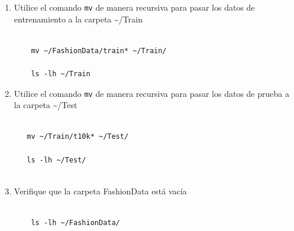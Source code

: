 \documentclass{article}
\begin{document}
\begin{enumerate}
\begin{enumerate}
\url{http://fashion-mnist.s3-website.eu-central-1.amazonaws.com/train-images-idx3-ubyte.gz}
\item Etiquetas de entrenamiento:

\url{http://fashion-mnist.s3-website.eu-central-1.amazonaws.com/train-labels-idx1-ubyte.gz}
\item Imágenes de prueba:

\url{http://fashion-mnist.s3-website.eu-central-1.amazonaws.com/t10k-images-idx3-ubyte.gz}
\item Etiquetas de prueba:

\url{http://fashion-mnist.s3-website.eu-central-1.amazonaws.com/t10k-labels-idx1-ubyte.gz}
\end{enumerate}
\begin{verbatim}

    cd ~/FashionData

    wget http://fashion-mnist.s3-website.eu-central-1.amazonaws.com/train-images-idx3-ubyte.gz
    wget http://fashion-mnist.s3-website.eu-central-1.amazonaws.com/train-labels-idx1-ubyte.gz
    wget http://fashion-mnist.s3-website.eu-central-1.amazonaws.com/t10k-images-idx3-ubyte.gz
    wget http://fashion-mnist.s3-website.eu-central-1.amazonaws.com/t10k-labels-idx1-ubyte.gz

\end{verbatim}

\item Utilice el comando \texttt{mv} de manera recursiva para pasar los datos de
entrenamiento a la carpeta \textasciitilde{}/Train
\begin{verbatim}

    mv ~/FashionData/train* ~/Train/

    ls -lh ~/Train
\end{verbatim}

\item Utilice el comando \texttt{mv} de manera recursiva para pasar los datos de
prueba a la carpeta \textasciitilde{}/Test
\begin{verbatim}

   mv ~/Train/t10k* ~/Test/

   ls -lh ~/Test/
   
\end{verbatim}

\item Verifique que la carpeta FashionData está vacía
\begin{verbatim}

    ls -lh ~/FashionData/


\end{verbatim}
\end{enumerate}
\end{document}
